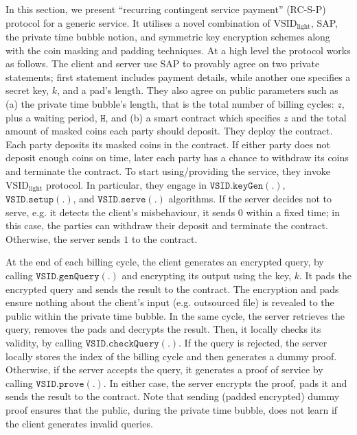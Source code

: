  
 In this section, we present  ``recurring contingent service payment'' (RC-S-P) protocol for a generic service. It utilises a novel combination of $\text{VSID}_{\scriptscriptstyle\text{light}}$, SAP, the private time bubble notion, and symmetric key encryption schemes along with the coin masking and padding techniques. At a high level the protocol works as follows.  The  client and server use SAP to provably agree on two private statements; first statement includes  payment details, while another one specifies a secret key, $k$, and a pad's length. They also  agree on  public parameters such as (a) the private time bubble's length, that is the total number of billing cycles: $z$, plus a waiting period, $\texttt{H}$, and (b) a smart contract which  specifies $z$ and  the total amount of masked coins each party should deposit. They deploy the contract.  Each party deposits its masked coins in the contract. If either party does not deposit enough coins on time,   later each party has a chance to withdraw its coins and terminate the contract. To start using/providing the service, they invoke $\text{VSID}_{\scriptscriptstyle\text{light}}$ protocol. In particular, they engage in   $\mathtt{VSID.keyGen}(.)$, $\mathtt{VSID.setup}(.)$, and $\mathtt{VSID.serve}(.)$ algorithms. If the server decides not to serve, e.g. it detects the client's misbehaviour,  it sends $0$  within a fixed time; in this case, the parties can withdraw their deposit and terminate the contract. Otherwise, the server sends $1$ to the contract. 
 
 
 
At the end of each billing cycle, the client generates an encrypted query, by calling $\mathtt{VSID.genQuery}(.)$ and encrypting its output using the key, $k$. It pads the encrypted query and  sends the result  to the contract. The encryption and pads ensure  nothing about the client's input (e.g. outsourced file) is revealed to the public within the private time bubble.  In the same cycle, the server retrieves the query, removes the pads and decrypts the result. Then, it locally checks its validity, by calling $\mathtt{VSID.checkQuery}(.)$. If the query is rejected, the server locally stores the index of the billing cycle and then  generates a dummy proof.  Otherwise, if the server accepts the query, it generates a proof of service by calling $\mathtt{VSID.prove}(.)$. In either case, the server encrypts the proof, pads it and sends the result to the contract. Note that sending (padded encrypted) dummy proof ensures that the public, during the private time bubble, does not learn if the client generates invalid queries. 


